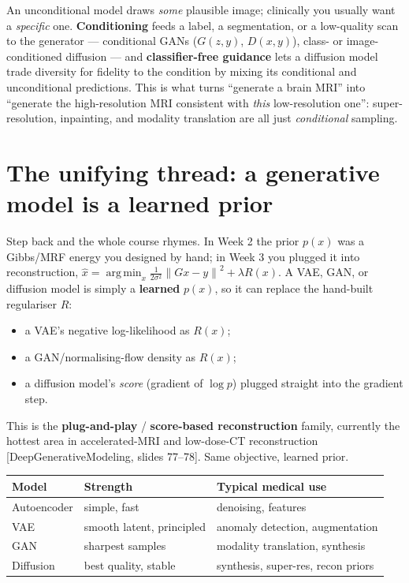 \documentclass[11pt]{article}
\newcommand{\norm}[1]{\left\lVert #1 \right\rVert}
\newcommand{\deck}[1]{\textsf{\small[#1]}}
\DeclareMathOperator*{\argmin}{arg\,min}
\begin{document}
An unconditional model draws \emph{some} plausible image; clinically you usually
want a \emph{specific} one. \textbf{Conditioning} feeds a label, a segmentation,
or a low-quality scan to the generator --- conditional GANs ($G(z,y)$, $D(x,y)$),
class- or image-conditioned diffusion --- and \textbf{classifier-free guidance}
lets a diffusion model trade diversity for fidelity to the condition by mixing its
conditional and unconditional predictions. This is what turns ``generate a brain
MRI'' into ``generate the high-resolution MRI consistent with \emph{this}
low-resolution one'': super-resolution, inpainting, and modality translation are
all just \emph{conditional} sampling.

\section{The unifying thread: a generative model is a learned prior}

Step back and the whole course rhymes. In Week 2 the prior $p(x)$ was a Gibbs/MRF
energy you designed by hand; in Week 3 you plugged it into reconstruction,
$\hat x=\argmin_x \tfrac{1}{2\sigma^2}\norm{Gx-y}^2 + \lambda R(x)$. A VAE, GAN,
or diffusion model is simply a \textbf{learned} $p(x)$, so it can replace the
hand-built regulariser $R$:
\begin{itemize}[nosep,leftmargin=*]
  \item a VAE's negative log-likelihood as $R(x)$;
  \item a GAN/normalising-flow density as $R(x)$;
  \item a diffusion model's \emph{score} (gradient of $\log p$) plugged straight
  into the gradient step.
\end{itemize}
This is the \textbf{plug-and-play} / \textbf{score-based reconstruction} family,
currently the hottest area in accelerated-MRI and low-dose-CT reconstruction
\deck{DeepGenerativeModeling, slides 77--78}. Same objective, learned prior.

\begin{notebox}
\begin{tabular}{@{}lll@{}}
\toprule
Model & Strength & Typical medical use \\
\midrule
Autoencoder & simple, fast & denoising, features \\
VAE & smooth latent, principled & anomaly detection, augmentation \\
GAN & sharpest samples & modality translation, synthesis \\
Diffusion & best quality, stable & synthesis, super-res, recon priors \\
\bottomrule
\end{tabular}
\end{notebox}
\end{document}
